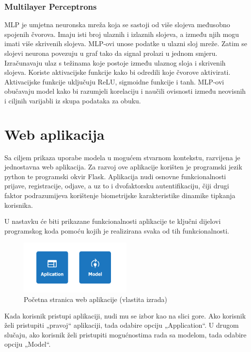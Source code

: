 \documentclass[]{foi}
\begin{document}
\subsection{Multilayer Perceptrons}
MLP je umjetna neuronska mreža koja se sastoji od više slojeva međusobno spojenih čvorova. Imaju isti broj ulaznih i izlaznih slojeva, a između njih mogu imati više skrivenih slojeva. 
MLP-ovi unose podatke u ulazni sloj mreže. Zatim se slojevi neurona povezuju u graf tako da signal prolazi u jednom smjeru. Izračunavaju ulaz s težinama koje postoje između ulaznog sloja i skrivenih slojeva. Koriste aktivacijske funkcije kako bi odredili koje čvorove aktivirati. Aktivacijske funkcije uključuju ReLU, sigmoidne funkcije i tanh. MLP-ovi obučavaju model kako bi razumjeli korelaciju i naučili ovisnosti između neovisnih i ciljnih varijabli iz skupa podataka za obuku. \cite{Simplilearn}

\chapter{Web aplikacija}
Sa ciljem prikaza uporabe modela u mogućem stvarnom kontekstu, razvijena je jednostavna web aplikacija. Za razvoj ove aplikacije korišten je programski jezik python te programski okvir Flask. Aplikacija nudi osnovne funkcionalnosti prijave, registracije, odjave, a uz to i dvofaktorsku autentifikaciju, čiji drugi faktor podrazumijeva korištenje biometrijske karakteristike dinamike tipkanja korisnika. 

U nastavku će biti prikazane funkcionalnosti aplikacije te ključni dijelovi programskog koda pomoću kojih je realizirana svaka od tih funkcionalnosti.

\begin{figure}[!h]
    \centering
    \includegraphics[width=0.5\textwidth]{slike/app_pocetna.png}
    \caption{Početna stranica web aplikacije (vlastita izrada)}
    \label{fig:app-pocetna}
\end{figure}

Kada korisnik pristupi aplikaciji, nudi mu se izbor kao na slici gore. Ako korisnik želi pristupiti „pravoj“ aplikaciji, tada odabire opciju „Application“. U drugom slučaju, ako korisnik želi pristupiti mogućnostima rada sa modelom, tada odabire opciju „Model“.
\end{document}
